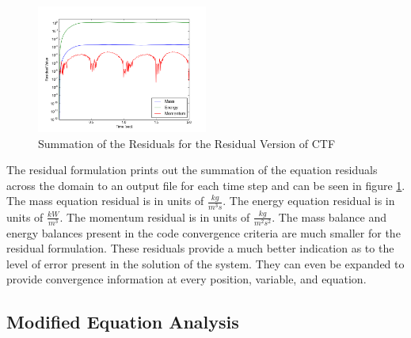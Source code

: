 \documentclass{mc2015}
\begin{document}
\begin{figure}[!h]
	\centering
	\includegraphics[width=0.50\textwidth]{images/Code_Verification/run_00_00/residual/results/Residuals_Plot}
	\caption{Summation of the Residuals for the Residual Version of CTF}
	\label{fig:Residuals_Plot}
\end{figure}

The residual formulation prints out the summation of the equation residuals
across the domain to an output file for each time step and can be seen in
figure \ref{fig:Residuals_Plot}. The mass equation residual is in units of
$\frac{kg}{m^{3}s}$. The energy equation residual is in units of
$\frac{kW}{m^{3}}$. The momentum residual is in units of
$\frac{kg}{m^{2}s^{2}}$. The mass balance and energy balances present in the
code convergence criteria are much smaller for the residual formulation.
These residuals provide a much better indication as to the level of error
present in the solution of the system. They can even be expanded to provide
convergence information at every position, variable, and equation. 

%
%

\subsection{Modified Equation Analysis}
    
\end{document}
